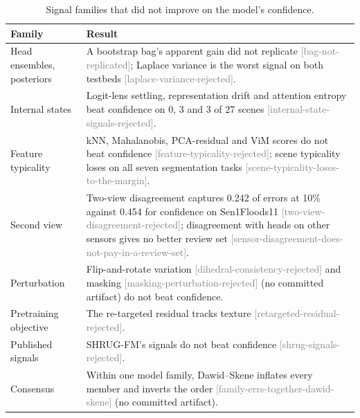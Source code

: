 \documentclass[11pt,a4paper]{article}
\makeatletter
\newcommand{\claim}[1]{{\scriptsize\textsf{\textcolor{gray}{[#1]}}}}
\providecommand{\FloatBarrier}{\par\begingroup\let\@elt\relax
  \edef\@tempa{\@botlist\@deferlist\@dbldeferlist}\ifx\@tempa\@empty\else\clearpage\fi\endgroup}
\makeatother
\begin{document}
\begin{table}[h]
\centering\small
\begin{tabularx}{\linewidth}{lX}
\toprule
Family & Result \\
\midrule
Head ensembles, posteriors & A bootstrap bag's apparent gain did not replicate \claim{bag-not-replicated}; Laplace variance is the worst signal on both testbeds \claim{laplace-variance-rejected}. \\
Internal states & Logit-lens settling, representation drift and attention entropy beat confidence on 0, 3 and 3 of 27 scenes \claim{internal-state-signals-rejected}. \\
Feature typicality & kNN, Mahalanobis, PCA-residual and ViM scores do not beat confidence \claim{feature-typicality-rejected}; scene typicality loses on all seven segmentation tasks \claim{scene-typicality-loses-to-the-margin}. \\
Second view & Two-view disagreement captures 0.242 of errors at 10\% against 0.454 for confidence on Sen1Floods11 \claim{two-view-disagreement-rejected}; disagreement with heads on other sensors gives no better review set \claim{sensor-disagreement-does-not-pay-in-a-review-set}. \\
Perturbation & Flip-and-rotate variation \claim{dihedral-consistency-rejected} and masking \claim{masking-perturbation-rejected} (no committed artifact) do not beat confidence. \\
Pretraining objective & The re-targeted residual tracks texture \claim{retargeted-residual-rejected}. \\
Published signals & SHRUG-FM's signals \citep{gonzalez2025} do not beat confidence \claim{shrug-signals-rejected}. \\
Consensus & Within one model family, Dawid--Skene inflates every member and inverts the order \claim{family-errs-together-dawid-skene} (no committed artifact). \\
\bottomrule
\end{tabularx}
\caption{Signal families that did not improve on the model's confidence.}
\label{tab:neg}
\end{table}

\FloatBarrier
\end{document}
